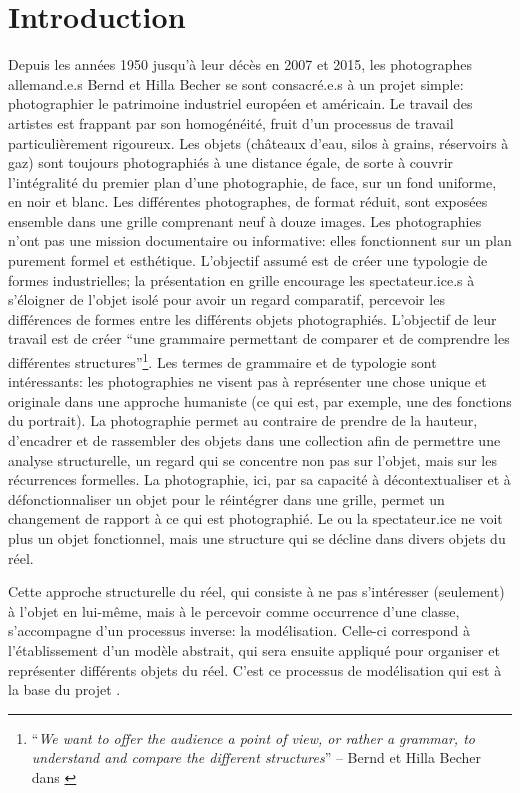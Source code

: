 \chapter*{Introduction}
Depuis les années 1950 jusqu'à leur décès en 2007 et 2015, les photographes allemand.e.s Bernd et Hilla Becher se sont consacré.e.s à un projet simple: photographier le patrimoine industriel européen et américain. Le travail des artistes est frappant par son homogénéité, fruit d'un processus de travail particulièrement rigoureux. Les objets (châteaux d'eau, silos à grains, réservoirs à gaz) sont toujours photographiés à une distance égale, de sorte à couvrir l'intégralité du premier plan d'une photographie, de face, sur un fond uniforme, en noir et blanc. Les différentes photographes, de format réduit, sont exposées ensemble dans une grille comprenant neuf à douze images. Les photographies n'ont pas une mission documentaire ou informative: elles fonctionnent sur un plan purement formel et esthétique. L'objectif assumé est de créer une typologie de formes industrielles; la présentation en grille encourage les spectateur.ice.s à s'éloigner de l'objet isolé pour avoir un regard comparatif, percevoir les différences de formes entre les différents objets photographiés. L'objectif de leur travail est de créer \enquote{une grammaire permettant de comparer et de comprendre les différentes structures}\footnote{
	\enquote{\textit{We want to offer the audience a point of view, or rather a grammar, to understand and compare the different structures}} -- Bernd et Hilla Becher dans \cite{stimson_photographic_2004}
}. Les termes de grammaire et de typologie sont intéressants: les photographies ne visent pas à représenter une chose unique et originale dans une approche humaniste (ce qui est, par exemple, une des fonctions du portrait). La photographie permet au contraire de prendre de la hauteur, d'encadrer et de rassembler des objets dans une collection afin de permettre une analyse structurelle, un regard qui se concentre non pas sur l'objet, mais sur les récurrences formelles. La photographie, ici, par sa capacité à décontextualiser et à défonctionnaliser un objet pour le réintégrer dans une grille, permet un changement de rapport à ce qui est photographié. Le ou la spectateur.ice ne voit plus un objet fonctionnel, mais une structure qui se décline dans divers objets du réel.

Cette approche structurelle du réel, qui consiste à ne pas s'intéresser (seulement) à l'objet en lui-même, mais à le percevoir comme occurrence d'une classe, s'accompagne d'un processus inverse: la modélisation. Celle-ci correspond à l'établissement d'un modèle abstrait, qui sera ensuite appliqué pour organiser et représenter différents objets du réel. C'est ce processus de modélisation qui est à la base du projet \mssktb{}. 


